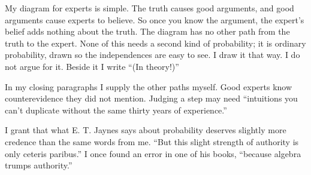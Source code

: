 My diagram for experts is simple. The truth causes good arguments, and good arguments cause experts to believe. So once you know the argument, the expert's belief adds nothing about the truth. The diagram has no other path from the truth to the expert. None of this needs a second kind of probability; it is ordinary probability, drawn so the independences are easy to see. I draw it that way. I do not argue for it. Beside it I write ``(In theory!)''

In my closing paragraphs I supply the other paths myself. Good experts know counterevidence they did not mention. Judging a step may need ``intuitions you can't duplicate without the same thirty years of experience.'' 

I grant that what E. T. Jaynes says about probability deserves slightly more credence than the same words from me. ``But this slight strength of authority is only ceteris paribus.'' I once found an error in one of his books, ``because algebra trumps authority.'' 
